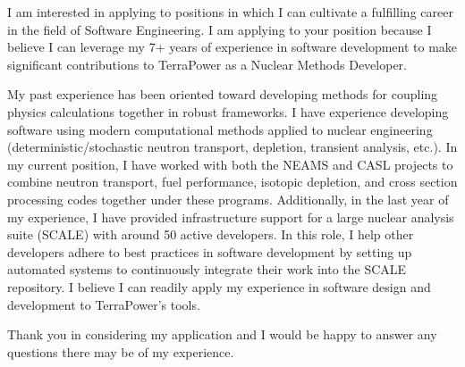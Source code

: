 I am interested in applying to positions in which I can cultivate a fulfilling career in the field of Software Engineering. I am applying to your position because I believe I can leverage my 7+ years of experience in software development to make significant contributions to TerraPower as a Nuclear Methods Developer.

My past experience has been oriented toward developing methods for coupling physics calculations together in robust frameworks. I have experience developing software using modern computational methods applied to nuclear engineering (deterministic/stochastic neutron transport, depletion, transient analysis, etc.). In my current position, I have worked with both the NEAMS and CASL projects to combine neutron transport, fuel performance, isotopic depletion, and cross section processing codes together under these programs. Additionally, in the last year of my experience, I have provided infrastructure support for a large nuclear analysis suite (SCALE) with around 50 active developers. In this role, I help other developers adhere to best practices in software development by setting up automated systems to continuously integrate their work into the SCALE repository. I believe I can readily apply my experience in software design and development to TerraPower’s tools.

Thank you in considering my application and I would be happy to answer any questions there may be of my experience.
